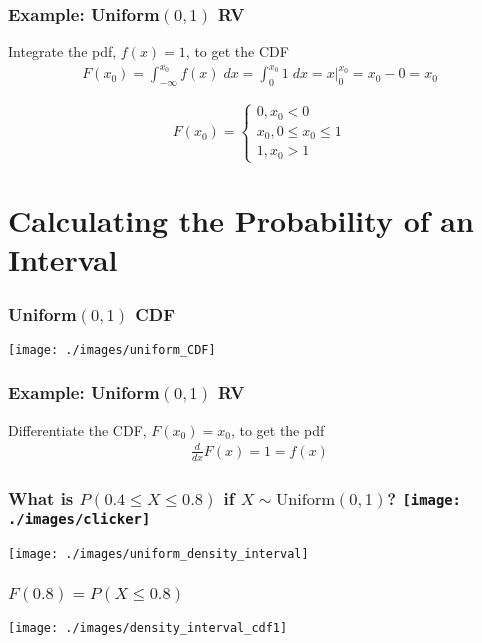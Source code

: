\begin{frame}
\frametitle{Example: Uniform$(0,1)$ RV}

Integrate the pdf, $f(x) = 1$, to get the CDF
\begin{eqnarray*}
	F(x_0) =\int_{-\infty}^{x_0} f(x)\; dx = \int_{0}^{x_0} 1\; dx =  \left. x \right|_0^{x_0} =  x_0 - 0 = x_0
\end{eqnarray*}

\vspace{1em}
$$ F(x_0) = \left\{ \begin{array}{c} 0, x_0 < 0\\ x_0, 0\leq x_0 \leq 1\\ 1, x_0 > 1   \end{array}\right.$$
\end{frame}


\section{Calculating the Probability of an Interval}
\begin{frame}
\frametitle{Uniform$(0,1)$ CDF}
\centering
	\texttt{[image: ./images/uniform\_CDF]}

\end{frame}


\begin{frame}
\frametitle{Example: Uniform$(0,1)$ RV}
Differentiate the CDF, $F(x_0) = x_0$, to get the pdf
 \begin{eqnarray*}
	\frac{d}{dx}F(x) =  1 = f(x)
 \end{eqnarray*}
\end{frame}



\begin{frame}
\frametitle{What is $P(0.4 \leq X \leq 0.8)$ if $X\sim \mbox{Uniform}(0,1)$? \hfill \texttt{[image: ./images/clicker]}}
\centering
	\texttt{[image: ./images/uniform\_density\_interval]}


\end{frame}
\begin{frame}
\frametitle{$F(0.8) = P(X \leq 0.8)$}

\centering
	\texttt{[image: ./images/density\_interval\_cdf1]}

\end{frame}


